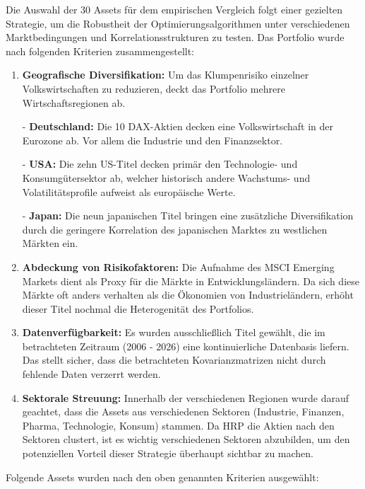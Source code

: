 \documentclass[parskip=half]{scrartcl}
\begin{document}
	Die Auswahl der 30 Assets für dem empirischen Vergleich folgt einer gezielten Strategie, um die Robustheit der Optimierungsalgorithmen unter verschiedenen Marktbedingungen und Korrelationsstrukturen zu testen. Das Portfolio wurde nach folgenden Kriterien zusammengestellt:
	
	\begin{enumerate}
		\item \textbf{Geografische Diversifikation:} Um das Klumpenrisiko einzelner Volkswirtschaften zu reduzieren, deckt das Portfolio mehrere Wirtschaftsregionen ab.
		
		- \textbf{Deutschland:} Die 10 DAX-Aktien decken eine Volkswirtschaft in der Eurozone ab. Vor allem die Industrie und den Finanzsektor.
		
		- \textbf{USA:} Die zehn US-Titel decken primär den Technologie- und Konsumgütersektor ab, welcher historisch andere Wachstums- und Volatilitätsprofile aufweist als europäische Werte.
		
		- \textbf{Japan:} Die neun japanischen Titel bringen eine zusätzliche Diversifikation durch die geringere Korrelation des japanischen Marktes zu westlichen Märkten ein.
		
		\item \textbf{Abdeckung von Risikofaktoren:} Die Aufnahme des MSCI Emerging Markets dient als Proxy für die Märkte in Entwicklungsländern. Da sich diese Märkte oft anders verhalten als die Ökonomien von Industrieländern, erhöht dieser Titel nochmal die Heterogenität des Portfolios. 
		
		\item \textbf{Datenverfügbarkeit:} Es wurden ausschließlich Titel gewählt, die im betrachteten Zeitraum (2006 - 2026) eine kontinuierliche Datenbasis liefern. Das stellt sicher, dass die betrachteten Kovarianzmatrizen nicht durch fehlende Daten verzerrt werden.
		
		\item \textbf{Sektorale Streuung:} Innerhalb der verschiedenen Regionen wurde darauf geachtet, dass die Assets aus verschiedenen Sektoren (Industrie, Finanzen, Pharma, Technologie, Konsum) stammen. Da HRP die Aktien nach den Sektoren clustert, ist es wichtig verschiedenen Sektoren abzubilden, um den potenziellen Vorteil dieser Strategie überhaupt sichtbar zu machen.
		
	\end{enumerate}
	
	\clearpage
	
	Folgende Assets wurden nach den oben genannten Kriterien ausgewählt:
	
\end{document}
